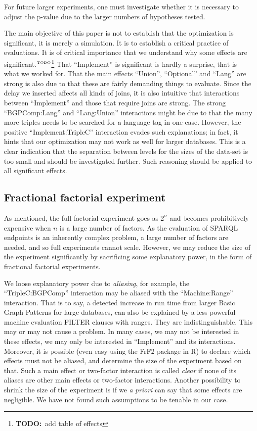 \documentclass{llncs}
\newcommand{\todo}[1]{\ensuremath{^{\textrm{\tiny{TODO}\normalsize}}}\footnote{\textbf{TODO:}~#1}}
\begin{document}
For future larger experiments, one must investigate whether it is
necessary to adjust the p-value due to the larger numbers of
hypotheses tested.

The main objective of this paper is not to establish that the
optimization is significant, it is merely a simulation. It is to
establish a critical practice of evaluations. It is of critical
importance that we understand why some effects are
significant.\todo{add table of effects} That ``Implement'' is
significant is hardly a surprise, that is what we worked for. That the
main effects ``Union'', ``Optional'' and ``Lang'' are strong is also
due to that these are fairly demanding things to evaluate. Since the
delay we inserted affects all kinds of joins, it is also intuitive
that interactions between ``Implement'' and those that require joins
are strong. The strong ``BGPComp:Lang'' and ``Lang:Union''
interactions might be due to that the many more triples needs to be
searched for a language tag in one case. However, the positive
``Implement:TripleC'' interaction evades such explanations; in fact,
it hints that our optimization may not work as well for larger
databases. This is a clear indication that the separation between
levels for the sizes of the data-set is too small and should be
investigated further. Such reasoning should be applied to all
significant effects.



\subsection{Fractional factorial experiment}\label{sec:frac}

As mentioned, the full factorial experiment goes as $2^n$ and becomes
prohibitively expensive when $n$ is a large number of
factors. As the evaluation of SPARQL endpoints is an inherently complex
problem, a large number of factors are needed, and so full experiments
cannot scale. However, we may reduce the size of the experiment
significantly by sacrificing some explanatory power, in the form of
fractional factorial experiments. 

We loose explanatory power due to \emph{aliasing}, for example, the
``TripleC:BGPComp'' interaction may be aliased with the
``Machine:Range'' interaction. That is to say, a detected increase in
run time from larger Basic Graph Patterns for large databases, can
also be explained by a less powerful machine evaluation FILTER clauses
with ranges. They are indistinguishable. This may or may not cause a
problem. In many cases, we may not be interested in these effects, we
may only be interested in ``Implement'' and its
interactions. Moreover, it is possible (even easy using the FrF2
package in R) to declare which effects must not be aliased, and
determine the size of the experiment based on that. Such a main effect
or two-factor interaction is called \emph{clear} if none of its
aliases are other main effects or two-factor interactions. Another
possibility to shrink the size of the experiment is if we \textit{a
  priori} can say that some effects are negligible. We have not found
such assumptions to be tenable in our case.
\end{document}
